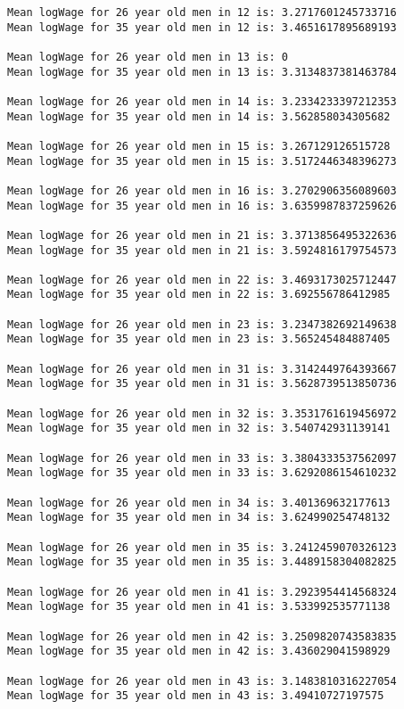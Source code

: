\documentclass[11pt]{article}
\begin{document}
    \begin{Verbatim}[commandchars=\\\{\}]
Mean logWage for 26 year old men in 12 is: 3.2717601245733716
Mean logWage for 35 year old men in 12 is: 3.4651617895689193

Mean logWage for 26 year old men in 13 is: 0
Mean logWage for 35 year old men in 13 is: 3.3134837381463784

Mean logWage for 26 year old men in 14 is: 3.2334233397212353
Mean logWage for 35 year old men in 14 is: 3.562858034305682

Mean logWage for 26 year old men in 15 is: 3.267129126515728
Mean logWage for 35 year old men in 15 is: 3.5172446348396273

Mean logWage for 26 year old men in 16 is: 3.2702906356089603
Mean logWage for 35 year old men in 16 is: 3.6359987837259626

Mean logWage for 26 year old men in 21 is: 3.3713856495322636
Mean logWage for 35 year old men in 21 is: 3.5924816179754573

Mean logWage for 26 year old men in 22 is: 3.4693173025712447
Mean logWage for 35 year old men in 22 is: 3.692556786412985

Mean logWage for 26 year old men in 23 is: 3.2347382692149638
Mean logWage for 35 year old men in 23 is: 3.565245484887405

Mean logWage for 26 year old men in 31 is: 3.3142449764393667
Mean logWage for 35 year old men in 31 is: 3.5628739513850736

Mean logWage for 26 year old men in 32 is: 3.3531761619456972
Mean logWage for 35 year old men in 32 is: 3.540742931139141

Mean logWage for 26 year old men in 33 is: 3.3804333537562097
Mean logWage for 35 year old men in 33 is: 3.6292086154610232

Mean logWage for 26 year old men in 34 is: 3.401369632177613
Mean logWage for 35 year old men in 34 is: 3.624990254748132

Mean logWage for 26 year old men in 35 is: 3.2412459070326123
Mean logWage for 35 year old men in 35 is: 3.4489158304082825

Mean logWage for 26 year old men in 41 is: 3.2923954414568324
Mean logWage for 35 year old men in 41 is: 3.533992535771138

Mean logWage for 26 year old men in 42 is: 3.2509820743583835
Mean logWage for 35 year old men in 42 is: 3.436029041598929

Mean logWage for 26 year old men in 43 is: 3.1483810316227054
Mean logWage for 35 year old men in 43 is: 3.49410727197575


\end{Verbatim}
\end{document}
